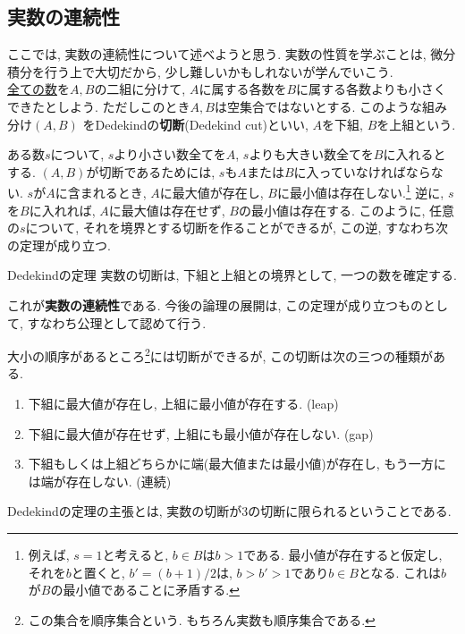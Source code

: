 \documentclass[a4j,dvipdfmx]{jsarticle}
\numberwithin{equation}{section}
\begin{document}
        \clearpage
        \subsection{実数の連続性}
            ここでは, 実数の連続性について述べようと思う. 実数の性質を学ぶことは, 微分積分を行う上で大切だから, 少し難しいかもしれないが学んでいこう.\\

            \underline{全ての数}を$A,B$の二組に分けて, $A$に属する各数を$B$に属する各数よりも小さくできたとしよう. ただしこのとき$A,B$は空集合ではないとする. このような組み分け$(A,B)$
            をDedekindの\textbf{切断}(Dedekind cut)といい, $A$を下組, $B$を上組という.

            ある数$s$について, $s$より小さい数全てを$A$, $s$よりも大きい数全てを$B$に入れるとする. $(A,B)$が切断であるためには, $s$も$A$または$B$に入っていなければならない.
            $s$が$A$に含まれるとき, $A$に最大値が存在し, $B$に最小値は存在しない.\footnote{例えば, $s=1$と考えると, $b\in B$は$b>1$である. 最小値が存在すると仮定し, それを$b$と置くと, 
            $b'=(b+1)/2$は, $b>b'>1$であり$b\in B$となる. これは$b$が$B$の最小値であることに矛盾する.} 逆に, $s$を$B$に入れれば, $A$に最大値は存在せず, $B$の最小値は存在する.
            このように, 任意の$s$について, それを境界とする切断を作ることができるが, この逆, すなわち次の定理が成り立つ.
            \begin{itembox}{Dedekindの定理}
                実数の切断は, 下組と上組との境界として, 一つの数を確定する.
            \end{itembox}
            これが\textbf{実数の連続性}である. 今後の論理の展開は, この定理が成り立つものとして, すなわち公理として認めて行う.

            大小の順序があるところ\footnote{この集合を順序集合という. もちろん実数も順序集合である.}には切断ができるが, この切断は次の三つの種類がある.

            \begin{enumerate}
                \item 下組に最大値が存在し, 上組に最小値が存在する. (leap)
                \item 下組に最大値が存在せず, 上組にも最小値が存在しない. (gap)
                \item 下組もしくは上組どちらかに端(最大値または最小値)が存在し, もう一方には端が存在しない. (連続)
            \end{enumerate}
            Dedekindの定理の主張とは, 実数の切断が3の切断に限られるということである.
\end{document}
